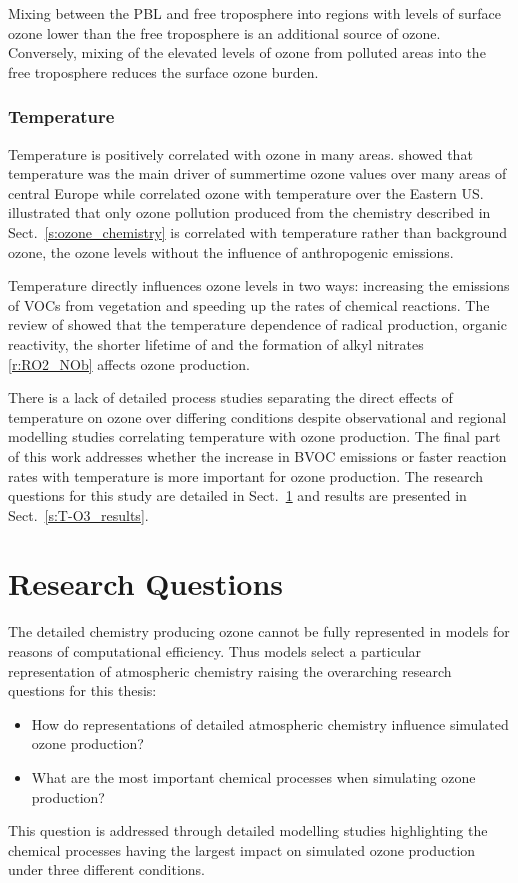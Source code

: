 Mixing between the PBL and free troposphere into regions with levels of surface ozone lower than the free troposphere is an additional source of ozone.
Conversely, mixing of the elevated levels of ozone from polluted areas into the free troposphere reduces the surface ozone burden.

\subsubsection{Temperature}
Temperature is positively correlated with ozone in many areas.
\citet{Otero:2016} showed that temperature was the main driver of summertime ozone values over many areas of central Europe while \citet{Camalier:2007} correlated ozone with temperature over the Eastern US.
\citet{Sillman:1995a} illustrated that only ozone pollution produced from the chemistry described in Sect.~\ref{s:ozone_chemistry} is correlated with temperature rather than background ozone, the ozone levels without the influence of anthropogenic emissions.

Temperature directly influences ozone levels in two ways: increasing the emissions of VOCs from vegetation and speeding up the rates of chemical reactions.
The review of \citet{Pusede:2015} showed that the temperature dependence of radical production, organic reactivity, the shorter lifetime of  and the formation of alkyl nitrates \eqref{r:RO2_NOb} affects ozone production.

There is a lack of detailed process studies separating the direct effects of temperature on ozone over differing  conditions despite observational and regional modelling studies correlating temperature with ozone production. 
The final part of this work addresses whether the increase in BVOC emissions or faster reaction rates with temperature is more important for ozone production.
The research questions for this study are detailed in Sect.~\ref{s:research_questions} and results are presented in Sect.~\ref{s:T-O3_results}.

\section{Research Questions} \label{s:research_questions}
The detailed chemistry producing ozone cannot be fully represented in models for reasons of computational efficiency.
Thus models select a particular representation of atmospheric chemistry raising the overarching research questions for this thesis:
\begin{itemize}
    \item How do representations of detailed atmospheric chemistry influence simulated ozone production?
    \item What are the most important chemical processes when simulating ozone production?
\end{itemize}
This question is addressed through detailed modelling studies highlighting the chemical processes having the largest impact on simulated ozone production under three different conditions.

